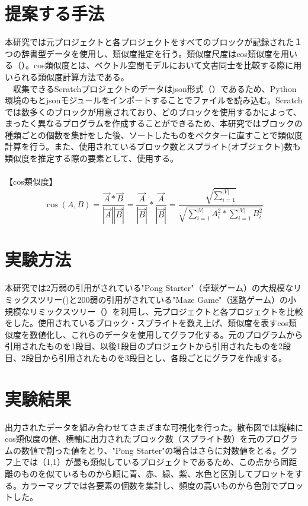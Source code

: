 \documentclass[twocolumn,9pt,a4paper]{jsarticle}
\begin{document}
\section{提案する手法}
本研究では元プロジェクトと各プロジェクトをすべてのブロックが記録された１つの辞書型データを使用し、類似度推定を行う。類似度尺度はcos類似度を用いる（\cite{cos}）。cos類似度とは、ベクトル空間モデルにおいて文書同士を比較する際に用いられる類似度計算方法である。
\\
　収集できるScratchプロジェクトのデータはjson形式（\cite{json_py}）であるため、Python環境のもとjsonモジュールをインポートすることでファイルを読み込む。Scratchでは数多くのブロックが用意されており、どのブロックを使用するかによって、まったく異なるプログラムを作成することができるため、本研究ではブロックの種類ごとの個数を集計をした後、ソートしたものをベクターに直すことで類似度計算を行う。また、使用されているブロック数とスプライト(オブジェクト)数も類似度を推定する際の要素として、使用する。
\\
\\【cos類似度】
\begin{equation}
\cos(A,B) = \frac{\vec{A} \ast\vec{B}} {|\vec{A}||\vec{B}|}  = \frac{\vec{A}}{|\vec{B}|}\ast\frac{\vec{A}}{|\vec{B}|} = \frac{\sqrt {\sum_{i=1}^{|V|}}}{\sqrt{\sum_{i=1}^{|V|}A_i^2\ast\sum_{i=1}^{|V|}B_i^2}}
\end{equation}


\section{実験方法}
本研究では2万弱の引用がされている"Pong Starter"（卓球ゲーム）の大規模なリミックスツリー(\cite{pongret})と200弱の引用がされている"Maze Game"（迷路ゲーム）の小規模なリミックスツリー（\cite{mazeret}）を利用し、元プロジェクトと各プロジェクトを比較をした。使用されているブロック・スプライトを数え上げ、類似度を表すcos類似度を数値化し、これらのデータを使用してグラフ化する。元のプログラムから引用されたものを1段目、以後1段目のプロジェクトから引用されたものを2段目、2段目から引用されたものを3段目とし、各段ごとにグラフを作成する。

\section{実験結果}
出力されたデータを組み合わせてさまざまな可視化を行った。散布図では縦軸にcos類似度の値、横軸に出力されたブロック数（スプライト数）を元のプログラムの数値で割った値をとり、"Pong Starter"の場合はさらに対数値をとる。グラフ上では（1,1）が最も類似しているプロジェクトであるため、この点から同距離のものを似ているものから順に青、赤、緑、紫、水色と区別してプロットをする。カラーマップでは各要素の個数を集計し、頻度の高いものから色別でプロットした。
\\
\end{document}
